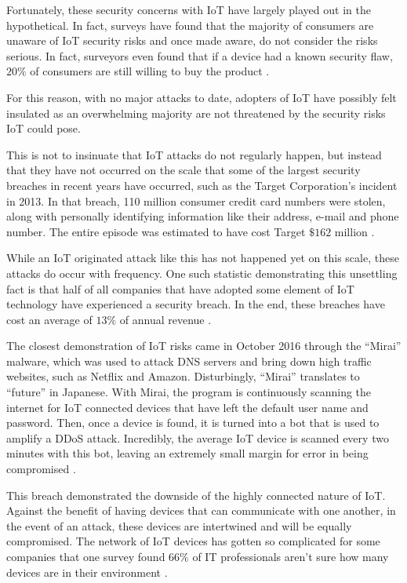\documentclass[sigconf]{acmart}
\begin{document}
Fortunately, these security concerns with IoT have largely played out in the hypothetical. In fact, surveys have found that the majority of consumers are unaware of IoT security risks and once made aware, do not consider the risks serious. In fact, surveyors even found that if a device had a known security flaw, $20\%$ of consumers are still willing to buy the product \cite{mcafee}. 

For this reason, with no major attacks to date, adopters of IoT have possibly felt insulated as an overwhelming majority are not threatened by the security risks IoT could pose. 

This is not to insinuate that IoT attacks do not regularly happen, but instead that they have not occurred on the scale that some of the largest security breaches in recent years have occurred, such as the Target Corporation's incident in 2013. In that breach, 110 million consumer credit card numbers were stolen, along with personally identifying information like their address, e-mail and phone number. The entire episode was estimated to have cost Target $\$162$ million \cite{target}.

While an IoT originated attack like this has not happened yet on this scale, these attacks do occur with frequency. One such statistic demonstrating this unsettling fact is that half of all companies that have adopted some element of IoT technology have experienced a security breach. In the end, these breaches have cost an average of $13\%$ of annual revenue \cite{halfbreach}. 

The closest demonstration of IoT risks came in October 2016 through the ``Mirai'' malware, which was used to attack DNS servers and bring down high traffic websites, such as Netflix and Amazon. Disturbingly, ``Mirai'' translates to ``future'' in Japanese.  With Mirai, the program is continuously scanning the internet for IoT connected devices that have left the default user name and password. Then, once a device is found, it is turned into a bot that is used to amplify a DDoS attack. Incredibly, the average IoT device is scanned every two minutes with this bot, leaving an extremely small margin for error in being compromised \cite{botnet}.

This breach demonstrated the downside of the highly connected nature of IoT. Against the benefit of having devices that can communicate with one another, in the event of an attack, these devices are intertwined and will be equally compromised. The network of IoT devices has gotten so complicated for some companies that one survey found $66\%$ of IT professionals aren't sure how many devices are in their environment \cite{mirai}. 
\end{document}
